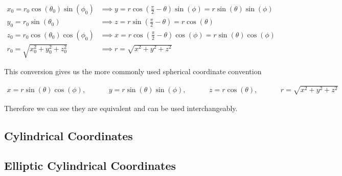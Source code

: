 \begin{align}
	x_0 = r_0\cos(\theta_0)\sin(\phi_0) &\implies y = r\cos(\frac{\pi}{2}-\theta)\sin(\phi) = r\sin(\theta)\sin(\phi) \\ 
y_0 = r_0\sin(\theta_0) &\implies z = r\sin(\frac{\pi}{2}-\theta) = r\cos(\theta) \\
z_0 = r_0\cos(\theta_0)\cos(\phi_0) &\implies x =  r\cos(\frac{\pi}{2}-\theta)\cos(\phi) = r\sin(\theta)\cos(\phi)\\
r_0 = \sqrt{x_0^2 + y_0^2 + z_0^2} &\implies r = \sqrt{x^2 + y^2 + z^2}
\end{align}

This conversion gives us the more commonly used spherical coordinate convention

\begin{align}	 
	x = r\sin(\theta)\cos(\phi), &\hspace{1cm} 
	y = r\sin(\theta)\sin(\phi), &\hspace{1cm} 
	z = r\cos(\theta), &\hspace{1cm}
	r = \sqrt{x^2 + y^2 + z^2}
\end{align}

Therefore we can see they are equivalent and can be used interchangeably.








\subsection{Cylindrical Coordinates}










\subsection{Elliptic Cylindrical Coordinates}





